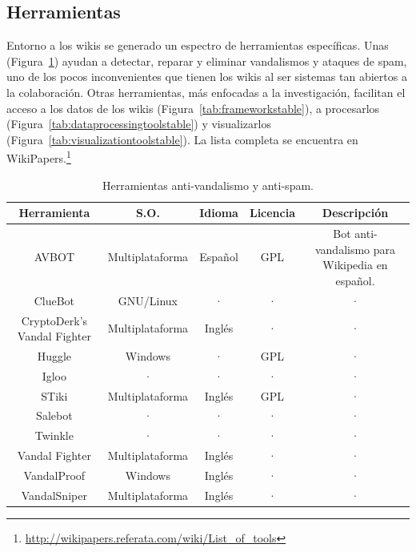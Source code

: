 \documentclass[11pt,onecolumn]{article}
\begin{document}
\subsection{Herramientas}


Entorno a los wikis se generado un espectro de herramientas específicas. Unas (Figura~\ref{tab:vandaltoolstable}) ayudan a detectar, reparar y eliminar vandalismos y ataques de spam, uno de los pocos inconvenientes que tienen los wikis al ser sistemas tan abiertos a la colaboración. Otras herramientas, más enfocadas a la investigación, facilitan el acceso a los datos de los wikis (Figura~\ref{tab:frameworkstable}), a procesarlos (Figura~\ref{tab:dataprocessingtoolstable}) y visualizarlos (Figura~\ref{tab:visualizationtoolstable}). La lista completa se encuentra en WikiPapers.\footnote{\href{http://wikipapers.referata.com/wiki/List_of_tools}{http://wikipapers.referata.com/wiki/List\_of\_tools}}

\begin{table}
\centering
\begin{tabular}{| c | c | c | c | c |}
\hline
\textbf{Herramienta} & \textbf{S.O.} & \textbf{Idioma} & \textbf{Licencia} & \textbf{Descripción} \\
\hline
AVBOT & Multiplataforma & Español & GPL & Bot anti-vandalismo para Wikipedia en español. \\ \hline
ClueBot & GNU/Linux & · & · & · \\ \hline
CryptoDerk's Vandal Fighter & Multiplataforma & Inglés & · & · \\ \hline
Huggle & Windows & · & GPL & · \\ \hline
Igloo & · & · & · & · \\ \hline
STiki & Multiplataforma & Inglés & GPL & · \\ \hline
Salebot & · & · & · & · \\ \hline
Twinkle & · & · & · & · \\ \hline
Vandal Fighter & Multiplataforma & Inglés & · & · \\ \hline
VandalProof & Windows & Inglés & · & · \\ \hline
VandalSniper & Multiplataforma & Inglés & · & · \\ \hline
\end{tabular}
\caption{Herramientas anti-vandalismo y anti-spam.}
\label{tab:vandaltoolstable}
\end{table}
\end{document}
